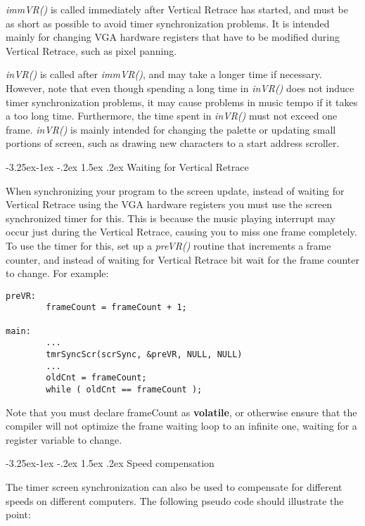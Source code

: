 \documentclass[a4paper,12pt,oneside]{book}
\makeatletter
\renewcommand\subsection{\@startsection{subsection}{2}{-20pt}%
                                     {-3.25ex\@plus -1ex \@minus -.2ex}%
                                     {1.5ex \@plus .2ex}%
                                     {\normalfont\large\bfseries}}
\makeatother
\begin{document}
{\em immVR()} is called immediately after Vertical Retrace has started, and
must be as short as possible to avoid timer synchronization problems. It is
intended mainly for changing VGA hardware registers that have to be modified
during Vertical Retrace, such as pixel panning.

{\em inVR()} is called after {\em immVR()}, and may take a longer time if
necessary. However, note that even though spending a long time in {\em
inVR()} does not induce timer synchronization problems, it may cause problems
in music tempo if it takes a too long time. Furthermore, the time spent in
{\em inVR()} must not exceed one frame. {\em inVR()} is mainly intended for
changing the palette or updating small portions of screen, such as drawing
new characters to a start address scroller.


\subsection{Waiting for Vertical Retrace}

When synchronizing your program to the screen update, instead of waiting for
Vertical Retrace using the VGA hardware registers you must use the screen
synchronized timer for this. This is because the music playing interrupt may
occur just during the Vertical Retrace, causing you to miss one frame
completely. To use the timer for this, set up a {\em preVR()} routine that
increments a frame counter, and instead of waiting for Vertical Retrace bit
wait for the frame counter to change. For example:

\begin{verbatim}
preVR:
        frameCount = frameCount + 1;

main:
        ...
        tmrSyncScr(scrSync, &preVR, NULL, NULL)
        ...
        oldCnt = frameCount;
        while ( oldCnt == frameCount );
\end{verbatim}

Note that you must declare frameCount as {\bf volatile}, or otherwise ensure
that the compiler will not optimize the frame waiting loop to an infinite
one, waiting for a register variable to change.


\subsection{Speed compensation}

The timer screen synchronization can also be used to compensate for different
speeds on different computers. The following pseudo code should illustrate
the point:
\end{document}
